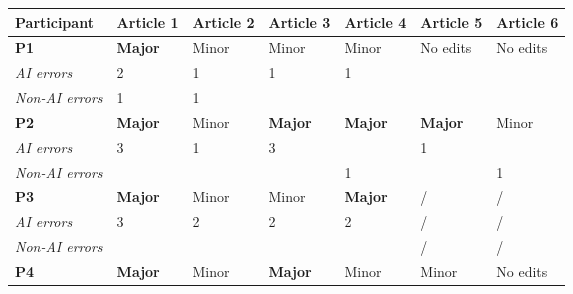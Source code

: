 \begin{table}
\centering
\begin{adjustbox}{width=0.48\textwidth}
\begin{tabular}{|l|l|l|l|l|l|l|}
\hline
\textbf{Participant} & \textbf{Article 1} & \textbf{Article 2} & \textbf{Article 3} & \textbf{Article 4} & \textbf{Article 5} & \textbf{Article 6} \\ \hline
\textbf{P1}      & \color{red}\textbf{Major}\color{black}               & Minor              & Minor              & Minor              & \color{teal}No edits \color{black}              & \color{teal}No edits \color{black}               \\ \hline
\textit{AI errors}   & 2                  & 1                  & 1                  & 1                  &                    &                    \\ 
\textit{Non-AI errors} & 1                & 1                  &                    &                    &                    &                    \\ \hline
\textbf{P2}        & \color{red}\textbf{Major}\color{black}               & Minor              & \color{red}\textbf{Major}\color{black}              & \color{red}\textbf{Major}\color{black}               & \color{red}\textbf{Major}\color{black}               & Minor              \\ \hline
\textit{AI errors}   & 3                  & 1                  & 3                  &                    & 1                  &                    \\ 
\textit{Non-AI errors} &                  &                    &                    & 1                  &                    & 1                  \\ \hline
\textbf{P3}      & \color{red}\textbf{Major}\color{black}              & Minor              & Minor              & \color{red}\textbf{Major}\color{black}               &       /            &     /                \\ \hline
\textit{AI errors}   & 3                  & 2                  & 2                  & 2                  &         /            &         /            \\ 
\textit{Non-AI errors} &                  &                     &                    &                    &    /                &      /             \\ \hline
\textbf{P4}       & \color{red}\textbf{Major}\color{black}               & Minor              & \color{red}\textbf{Major}\color{black}               & Minor              & Minor              & \color{teal}No edits \color{black}               \\ \hline

\end{tabular}
\end{adjustbox}
\end{table}
